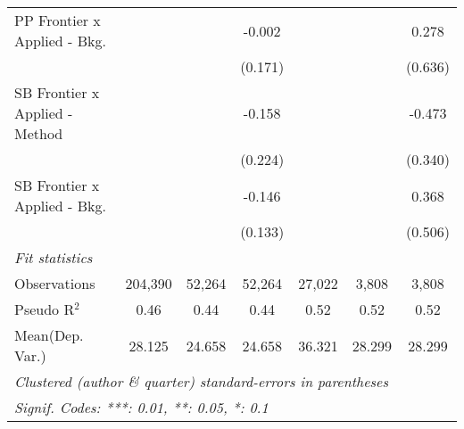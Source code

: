 \begin{tabular}{lcccccc}
   PP Frontier x Applied - Bkg.   &               &             & -0.002         &               &         & 0.278\\   
                                  &               &             & (0.171)        &               &         & (0.636)\\   
   SB Frontier x Applied - Method &               &             & -0.158         &               &         & -0.473\\   
                                  &               &             & (0.224)        &               &         & (0.340)\\   
   SB Frontier x Applied - Bkg.   &               &             & -0.146         &               &         & 0.368\\   
                                  &               &             & (0.133)        &               &         & (0.506)\\   
   \midrule
   \emph{Fit statistics}\\
   Observations                   & 204,390       & 52,264      & 52,264         & 27,022        & 3,808   & 3,808\\  
   Pseudo R$^2$                   & 0.46          & 0.44        & 0.44           & 0.52          & 0.52    & 0.52\\  
Mean(Dep. Var.) & 28.125 & 24.658 & 24.658 & 36.321 & 28.299 & 28.299 \\
   \midrule \midrule
   \multicolumn{7}{l}{\emph{Clustered (author \& quarter) standard-errors in parentheses}}\\
   \multicolumn{7}{l}{\emph{Signif. Codes: ***: 0.01, **: 0.05, *: 0.1}}\\
\end{tabular}
\par\endgroup
